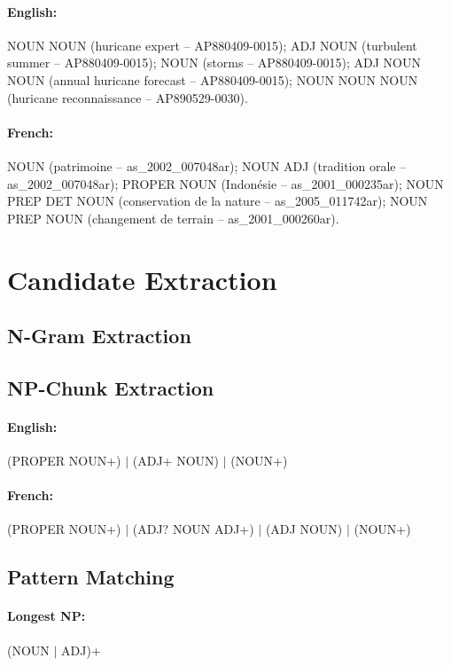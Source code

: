    \paragraph{English:} NOUN NOUN (huricane expert -- AP880409-0015); ADJ NOUN
    (turbulent summer -- AP880409-0015); NOUN (storms -- AP880409-0015); ADJ
    NOUN NOUN (annual huricane forecast -- AP880409-0015); NOUN NOUN NOUN
    (huricane reconnaissance -- AP890529-0030).
    \paragraph{French:} NOUN (patrimoine -- as\_2002\_007048ar); NOUN ADJ
    (tradition orale -- as\_2002\_007048ar); PROPER NOUN (Indonésie --
    as\_2001\_000235ar); NOUN PREP DET NOUN (conservation de la nature --
    as\_2005\_011742ar); NOUN PREP NOUN (changement de terrain --
    as\_2001\_000260ar).

\section{Candidate Extraction}
\label{sec:candidate_extraction}

  \subsection{N-Gram Extraction}
  \label{subsec:n_gram_extraction}

  \subsection{NP-Chunk Extraction}
  \label{subsec:np_chunk_extraction}
    \paragraph{English:} (PROPER NOUN+) $|$ (ADJ+ NOUN) $|$ (NOUN+)
    \paragraph{French:} (PROPER NOUN+) $|$ (ADJ? NOUN ADJ+) $|$ (ADJ NOUN) $|$ (NOUN+)

  \subsection{Pattern Matching}
  \label{subsec:pattern_matching}
    \paragraph{Longest NP:} (NOUN $|$ ADJ)+
